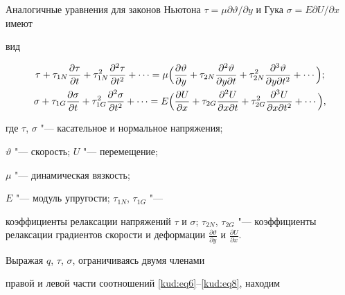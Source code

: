 Аналогичные уравнения для законов Ньютона $\tau=\mu \partial

\vartheta /\partial y$ и Гука $\sigma=E\partial U/\partial x$ имеют

вид

\begin{gather}

\label{kud:eq8}

\tau + \tau_{1N} \frac{\partial  \tau}{\partial t}+ 

\tau_{1N}^2 \frac{\partial^2 \tau}{\partial t^2}+\cdots=

\mu \Bigl( \frac{\partial \vartheta }{\partial y}+ \tau_{2N}

\frac{\partial ^2\vartheta }{\partial y\partial t}+ \tau_{2N}^2 

\frac{\partial^3 \vartheta }{\partial y\partial t^2}+\cdots \Bigr);\\

\label{kud:eq8}

\sigma+ \tau_{1G} \frac{\partial \sigma }{\partial t}+ 

\tau_{1G}^2 \frac{\partial ^2 \sigma}{\partial t^2}+\cdots=

E\Bigl(\frac{\partial U}{\partial x}+ \tau_{2G} 

\frac{\partial ^2 U}{\partial x\partial t}+ 

\tau_{2G}^2 \frac{\partial^3 U}{\partial x\partial t^2}+\cdots \Bigr),

\end{gather}

где $\tau$, $\sigma$ "--- касательное и нормальное напряжения;

$\vartheta $ "--- скорость; $U$ "--- перемещение; 

$ \mu $ "--- динамическая вязкость;

$E$ "--- модуль упругости; $\tau_{1N}$, $\tau_{1G}$ "---

коэффициенты релаксации напряжений $\tau$ и $\sigma $;  $\tau_{2N}$, $\tau_{2G}$  "--- коэффициенты релаксации  градиентов скорости и деформации $\frac{\partial \vartheta}{\partial y}$ и $\frac{\partial U}{\partial x}$. 



Выражая $q$, $\tau$, $\sigma$, ограничиваясь двумя членами

правой и левой части соотношений \eqref{kud:eq6}--\eqref{kud:eq8}, находим

